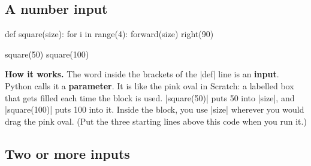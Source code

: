 \subsection*{A number input}

\begin{tcbraster}[raster columns=2, raster equal height=rows, raster column skip=12pt, raster valign=center, raster force size=false, raster column 1/.style={add to width=-2cm}, raster column 2/.style={add to width=2cm}]
\begin{tcolorbox}[colback=white, colframe=white, boxrule=0pt, valign=center]
\begin{scratch}
\end{scratch}
\par\medskip
\begin{scratch}
\end{scratch}
\end{tcolorbox}
\begin{code}
def square(size):
    for i in range(4):
        forward(size)
        right(90)

square(50)
square(100)
\end{code}
\end{tcbraster}

\textbf{How it works.} The word inside the brackets of the \py|def| line is an \textbf{input}. Python calls it a \textbf{parameter}. It is like the pink  oval in Scratch: a labelled box that gets filled each time the block is used. \py|square(50)| puts 50 into \py|size|, and \py|square(100)| puts 100 into it. Inside the block, you use \py|size| wherever you would drag the pink oval. (Put the three starting lines above this code when you run it.)

\subsection*{Two or more inputs}

